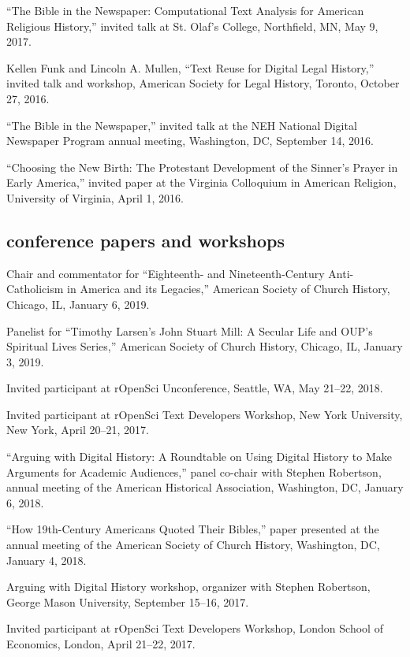 \documentclass[11pt]{article}
\begin{document}
``The Bible in the Newspaper: Computational Text Analysis for American 
Religious History,'' invited talk at St. Olaf's College, Northfield, MN, May 
9, 2017.

Kellen Funk and Lincoln A. Mullen, ``Text Reuse for Digital Legal History,'' 
invited talk and workshop, American Society for Legal History, Toronto, October 27, 2016.

``The Bible in the Newspaper,'' invited talk at the NEH National Digital Newspaper Program annual meeting, Washington, DC, September 14, 2016.

``Choosing the New Birth: The Protestant Development of the Sinner's Prayer in 
Early America,'' invited paper at the Virginia Colloquium in American 
Religion, University of Virginia, April 1, 2016.

\subsection{conference papers and workshops}\label{conference-papers}

Chair and commentator for ``Eighteenth- and Nineteenth-Century Anti-Catholicism in America and its Legacies,'' American Society of Church History, Chicago, IL, January 6, 2019.

Panelist for ``Timothy Larsen's John Stuart Mill: A Secular Life and OUP's Spiritual Lives Series,'' American Society of Church History, Chicago, IL, January 3, 2019.

Invited participant at rOpenSci Unconference, Seattle, WA, May 21--22, 2018.

Invited participant at rOpenSci Text Developers Workshop, New York University, 
New York, April 20--21, 2017.

``Arguing with Digital History: A Roundtable on Using Digital History to Make 
Arguments for Academic Audiences,'' panel co-chair with Stephen Robertson, 
annual meeting of the American Historical Association, Washington, DC, January 
6, 2018.

``How 19th-Century Americans Quoted Their Bibles,'' paper presented at the 
annual meeting of the American Society of Church History, Washington, DC, 
January 4, 2018.

Arguing with Digital History workshop, organizer with Stephen Robertson, 
George Mason University, September 15--16, 2017.

Invited participant at rOpenSci Text Developers Workshop, London School of Economics, London, April 21--22, 2017.
\end{document}
